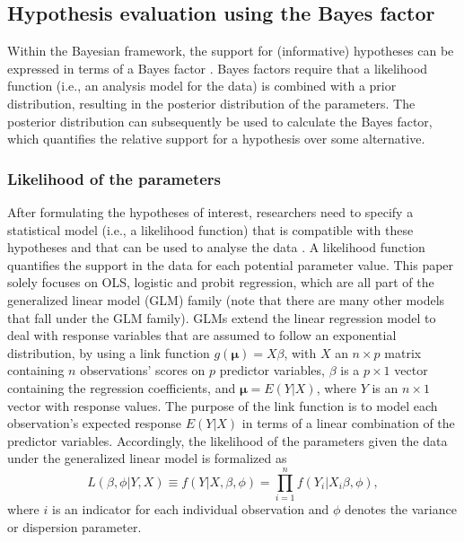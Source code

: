 \documentclass[review, 3p, authoryear]{elsarticle} %
\begin{document}
\hypertarget{hypothesis-evaluation-using-the-bayes-factor}{%
\subsection{Hypothesis evaluation using the Bayes factor}\label{hypothesis-evaluation-using-the-bayes-factor}}

Within the Bayesian framework, the support for (informative) hypotheses can be expressed in terms of a Bayes factor \citep{kass_raftery_bayes_factors_1995}.
Bayes factors require that a likelihood function (i.e., an analysis model for the data) is combined with a prior distribution, resulting in the posterior distribution of the parameters.
The posterior distribution can subsequently be used to calculate the Bayes factor, which quantifies the relative support for a hypothesis over some alternative.

\hypertarget{likelihood-of-the-parameters}{%
\subsubsection{Likelihood of the parameters}\label{likelihood-of-the-parameters}}

After formulating the hypotheses of interest, researchers need to specify a statistical model (i.e., a likelihood function) that is compatible with these hypotheses and that can be used to analyse the data \citep{lynch_introduction_2007}.
A likelihood function quantifies the support in the data for each potential parameter value.
This paper solely focuses on OLS, logistic and probit regression, which are all part of the generalized linear model (GLM) family (note that there are many other models that fall under the GLM family).
GLMs extend the linear regression model to deal with response variables that are assumed to follow an exponential distribution, by using a link function \(g(\boldsymbol{\mu}) = X\beta\), with \(X\) an \(n \times p\) matrix containing \(n\) observations' scores on \(p\) predictor variables, \(\beta\) is a \(p \times 1\) vector containing the regression coefficients, and \(\boldsymbol{\mu} = E(Y|X)\), where \(Y\) is an \(n \times 1\) vector with response values.
The purpose of the link function is to model each observation's expected response \(E(Y|X)\) in terms of a linear combination of the predictor variables.
Accordingly, the likelihood of the parameters given the data under the generalized linear model is formalized as
\[
L(\beta, \phi|Y, X) \equiv f(Y|X, \beta, \phi) = \prod^n_{i=1} f(Y_i|X_i \beta, \phi),
\]
where \(i\) is an indicator for each individual observation and \(\phi\) denotes the variance or dispersion parameter.
\end{document}
